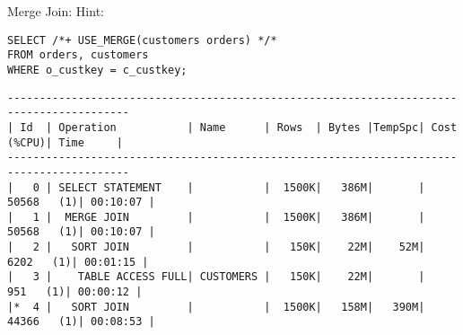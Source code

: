 \documentclass[11pt,a4paper,parskip=half]{scrartcl}
\begin{document}
Merge Join:
Hint:
\begin{lstlisting}
SELECT /*+ USE_MERGE(customers orders) */* 
FROM orders, customers
WHERE o_custkey = c_custkey;
\end{lstlisting}
\begin{lstlisting}
-----------------------------------------------------------------------------------------                                                                                                                                                                                                                    
| Id  | Operation           | Name      | Rows  | Bytes |TempSpc| Cost (%CPU)| Time     |                                                                                                                                                                                                                    
-----------------------------------------------------------------------------------------                                                                                                                                                                                                                    
|   0 | SELECT STATEMENT    |           |  1500K|   386M|       | 50568   (1)| 00:10:07 |                                                                                                                                                                                                                    
|   1 |  MERGE JOIN         |           |  1500K|   386M|       | 50568   (1)| 00:10:07 |                                                                                                                                                                                                                    
|   2 |   SORT JOIN         |           |   150K|    22M|    52M|  6202   (1)| 00:01:15 |                                                                                                                                                                                                                    
|   3 |    TABLE ACCESS FULL| CUSTOMERS |   150K|    22M|       |   951   (1)| 00:00:12 |                                                                                                                                                                                                                    
|*  4 |   SORT JOIN         |           |  1500K|   158M|   390M| 44366   (1)| 00:08:53 |                                                                                                                                                                                                                    

\end{lstlisting}
\end{document}
